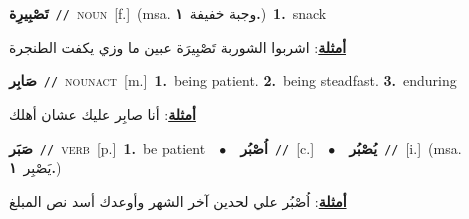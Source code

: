 \documentclass[10pt,a4paper,twoside]{article} %
\begin{document}
\begin{multicols}{2}
{\setlength\topsep{0pt}\textbf{\foreignlanguage{arabic}{تَصْبِيرِة}}\ {\color{gray}\texttt{//}\color{black}}\ \textsc{noun}\ [f.]\ \color{gray}(msa. \foreignlanguage{arabic}{وجبة خفيفة}~\foreignlanguage{arabic}{\textbf{١.}})\color{black}\ \textbf{1.}~snack\  \begin{flushright}\color{gray}\foreignlanguage{arabic}{\textbf{\underline{\foreignlanguage{arabic}{أمثلة}}}: اشربوا الشوربة تَصْبِيرَة عبين ما وزي يكفت الطنجرة}\end{flushright}\color{black}} \vspace{2mm}

{\setlength\topsep{0pt}\textbf{\foreignlanguage{arabic}{صَابِر}}\ {\color{gray}\texttt{//}\color{black}}\ \textsc{noun\textunderscore act}\ [m.]\ \textbf{1.}~being patient.  \textbf{2.}~being steadfast.  \textbf{3.}~enduring\  \begin{flushright}\color{gray}\foreignlanguage{arabic}{\textbf{\underline{\foreignlanguage{arabic}{أمثلة}}}: أنا صابِر عليك عشان أهلك}\end{flushright}\color{black}} \vspace{2mm}

{\setlength\topsep{0pt}\textbf{\foreignlanguage{arabic}{صَبَر}}\ {\color{gray}\texttt{//}\color{black}}\ \textsc{verb}\ [p.]\ \textbf{1.}~be patient\ \ $\bullet$\ \ \setlength\topsep{0pt}\textbf{\foreignlanguage{arabic}{اُصْبُر}}\ {\color{gray}\texttt{//}\color{black}}\ [c.]\ \ $\bullet$\ \ \setlength\topsep{0pt}\textbf{\foreignlanguage{arabic}{يُصْبُر}}\ {\color{gray}\texttt{//}\color{black}}\ [i.]\ \color{gray}(msa. \foreignlanguage{arabic}{يَصْبِر}~\foreignlanguage{arabic}{\textbf{١.}})\color{black}\  \begin{flushright}\color{gray}\foreignlanguage{arabic}{\textbf{\underline{\foreignlanguage{arabic}{أمثلة}}}: اُصْبُر علي لحدين آخر الشهر وأوعدك أسد نص المبلغ}\end{flushright}\color{black}} \vspace{2mm}


\end{multicols}
\end{document}
